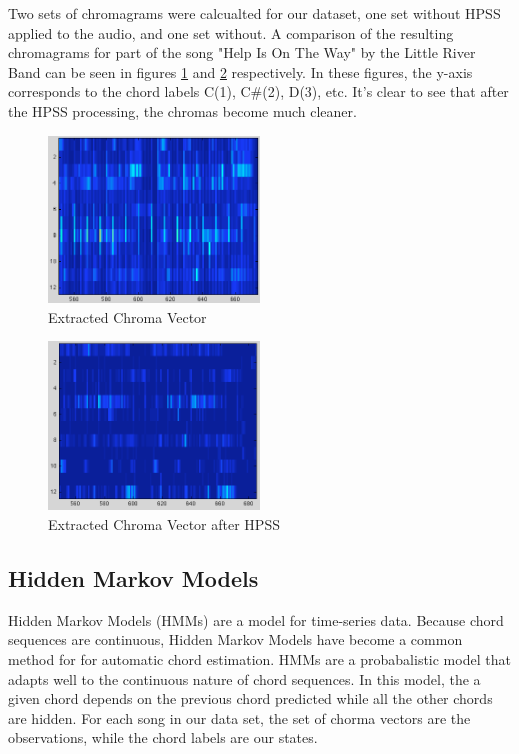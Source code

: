 \documentclass{article}
\begin{document}
Two sets of chromagrams were calcualted for our dataset, one set without HPSS
applied to the audio, and one set without. A comparison of the resulting
chromagrams for part of the song "Help Is On The Way" by the Little River Band
can be seen in figures \ref{fig:ChromaNorm} and \ref{fig:ChromaHPSS}
respectively. In these figures, the y-axis corresponds to the chord labels
C(1), C\#(2), D(3), etc. It's clear to see that after the HPSS processing, the
chromas become much cleaner.

\begin{figure}
	\centering
	\includegraphics[width=0.5\textwidth]{187.png}
	\caption{Extracted Chroma Vector}
	\label{fig:ChromaNorm}
\end{figure}

\begin{figure}
	\centering
	\includegraphics[width=0.5\textwidth]{187h.png}
	\caption{Extracted Chroma Vector after HPSS}
	\label{fig:ChromaHPSS}
\end{figure}

\subsection{Hidden Markov Models}

Hidden Markov Models (HMMs) are a model for time-series data. Because chord
sequences are continuous,  Hidden Markov Models have become a common method for
for automatic chord estimation. HMMs are a probabalistic model that adapts well
to the continuous nature of chord sequences. In this model, the a given chord
depends on the previous chord predicted while all the other chords are hidden.
For each song in our data set, the set of chorma vectors are the observations,
while the chord labels are our states.
\end{document}
